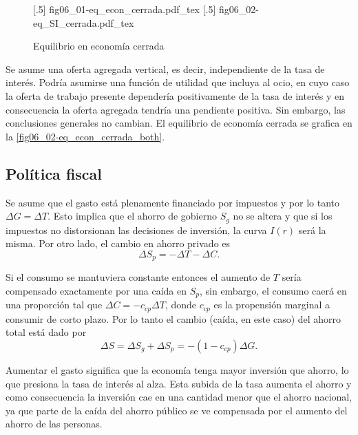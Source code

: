 \documentclass[DeGregorioResumen]{subfiles}
\begin{document}
\begin{figure}[h]
\centering
{}
[.5\linewidth]{\def\svgwidth{0.45\textwidth}
{fig06_01-eq_econ_cerrada.pdf_tex}}%
[.5\linewidth]{\def\svgwidth{0.45\textwidth}
{fig06_02-eq_SI_cerrada.pdf_tex}}
\caption{Equilibrio en economía cerrada}\label{fig:06_eq_econ_cerrada}
\label{fig06_02-eq_econ_cerrada_both}
\end{figure}

Se asume una oferta agregada vertical, es decir, independiente de la tasa de interés. Podría asumirse una función de utilidad que incluya al ocio, en cuyo caso la oferta de trabajo presente dependería positivamente de la tasa de interés y en consecuencia la oferta agregada tendría una pendiente positiva. Sin embargo, las conclusiones generales no cambian. El equilibrio de economía cerrada se grafica en la \autoref{fig06_02-eq_econ_cerrada_both}.

\subsection{Política fiscal}


Se asume que el gasto está plenamente financiado por impuestos y por lo tanto $\Delta G =\Delta T $. Esto implica que el ahorro de gobierno $S_g$ no se altera y que si los impuestos no distorsionan las decisiones de inversión, la curva $I(r)$ será la misma. Por otro lado, el cambio en ahorro privado es
\begin{equation*}
\Delta S_p = - \Delta T - \Delta C.
\end{equation*}

Si el consumo se mantuviera constante entonces el aumento de $T$ sería compensado exactamente por una caída en $S_p$, sin embargo, el consumo caerá en una proporción tal que $\Delta C = -c_{cp}\Delta T $, donde $c_{cp}$ es la propensión marginal a consumir de corto plazo. Por lo tanto el cambio (caída, en este caso) del ahorro total está dado por
\begin{equation*}
\Delta S = \Delta S_g + \Delta S_p = -(1-c_{cp}) \Delta G.
\end{equation*}



Aumentar el gasto significa que la economía tenga mayor inversión que ahorro, lo que presiona la tasa de interés al alza. Esta subida de la tasa aumenta el ahorro y como consecuencia la inversión cae en una cantidad menor que el ahorro nacional, ya que parte de la caída del ahorro público se ve compensada por el aumento del ahorro de las personas.
\end{document}
